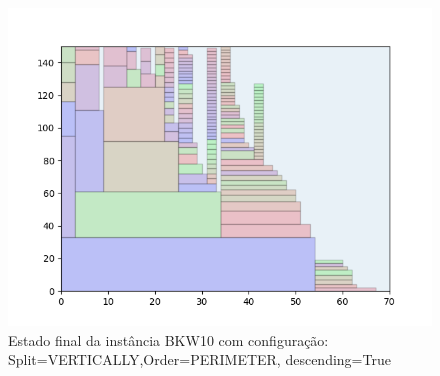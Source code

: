 \begin{figure}[H]
    \centering
    \caption[]{Estado final da instância BKW10 com configuração: Split=VERTICALLY,Order=PERIMETER, descending=True}
    \label{fig:bkw10-vertically-perimeter-true}
    \includegraphics[scale=0.5]{output/figures/bkw/bkw10/vertically/perimeter/true/000}
\end{figure}